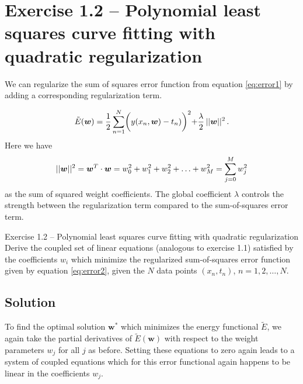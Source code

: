 \documentclass[11pt,DINA4, fleqn]{amsart}
\def\vw{\boldsymbol{w}\xspace}
\begin{document}
\section*{Exercise 1.2 -- Polynomial least squares curve fitting with quadratic regularization}
We can regularize the sum of squares error function from equation \eqref{eq:error1} by adding a corresponding regularization term. 

\begin{align}
\tilde{E}(\vw) = \dfrac{1}{2} \sum \displaylimits_{n = 1}^{N}
\biggl(y(x_n, \vw) - t_n)\biggl)^2 + \dfrac{\lambda}{2} \, || \vw ||^2 \, .
\label{eq:error2}
\end{align}
Here we have
\begin{align}
||\vw||^2 = \vw^T \cdot \vw  = w_0^2 + w_1^2 + w_2^2 + \dotsc +  w_M^2 = \sum \displaylimits_{j = 0}^{M} w_j^2
\end{align}
as the sum of squared weight coefficients. The global coefficient $\lambda$ controls the strength between the regularization term compared to the sum-of-squares error term.

\begin{mybox_tc3}{Exercise 1.2 -- Polynomial least squares curve fitting with quadratic regularization}
	Derive the coupled set of linear equations (analogous to exercise 1.1) satisfied by the coefficients
	$w_i$ which minimize the regularized sum-of-squares error function given by equation \eqref{eq:error2}, given the $N$ data points $(x_n, t_n)$, $n = 1, 2, \dotsc, N$.
\end{mybox_tc3}

\subsection*{Solution}
To find the optimal solution $\vw^*$ which minimizes the energy functional $\tilde{E}$, we again take the partial derivatives of $\tilde{E}(\vw)$ with respect to the weight parameters $w_j$ for all $j$ as before.
Setting these equations to zero again leads to a system of coupled equations which for this error functional again happens to be linear in the coefficients $w_j$.
\end{document}
